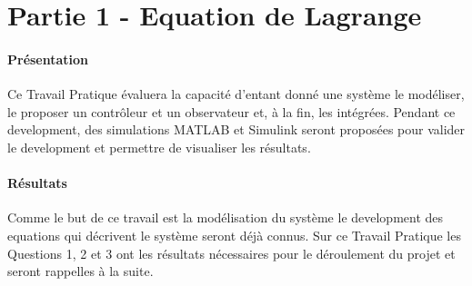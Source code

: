 \documentclass[class=article, crop=false]{standalone}
\begin{document}
\section*{Partie 1 - Equation de Lagrange}
\paragraph{Présentation}Ce Travail Pratique évaluera la capacité d'entant donné une système le modéliser, le proposer un contrôleur et un observateur et, à la fin, les intégrées. Pendant ce development, des simulations MATLAB et Simulink seront proposées pour valider le development et permettre de visualiser les résultats.

\paragraph{Résultats}Comme le but de ce travail est la modélisation du système le development des equations qui décrivent le système seront déjà connus. Sur ce Travail Pratique les Questions 1, 2 et 3 ont les résultats nécessaires pour le déroulement du projet et seront rappelles à la suite.
\end{document}
